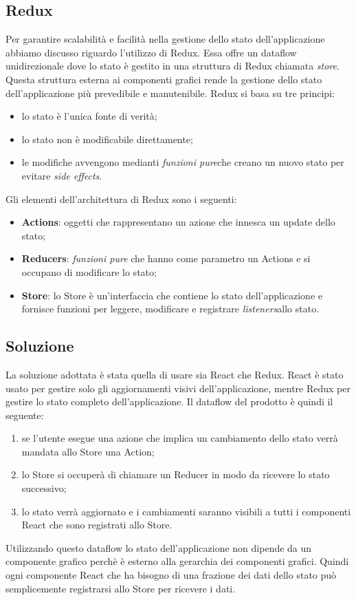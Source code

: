 \subsection{Redux}
Per garantire scalabilità e facilità nella gestione dello stato dell'applicazione abbiamo discusso riguardo l'utilizzo di Redux. Essa offre un dataflow unidirezionale dove lo stato è gestito in una struttura di Redux chiamata \emph{store}. Questa struttura esterna ai componenti grafici rende la gestione dello stato dell'applicazione più prevedibile e manutenibile. Redux si basa su tre principi:
\begin{itemize}
	\item lo stato è l'unica fonte di verità;
	\item lo stato non è modificabile direttamente;
	\item le modifiche avvengono medianti \emph{funzioni pure}\glosp che creano un nuovo stato per evitare \emph{side effects}\glo.
\end{itemize}
\noindent
Gli elementi dell'architettura di Redux sono i seguenti:
\begin{itemize}
	\item \textbf{Actions}: oggetti che rappresentano un azione che innesca un update dello stato;
	\item \textbf{Reducers}: \emph{funzioni pure} che hanno come parametro un Actions e si occupano di modificare lo stato;
	\item \textbf{Store}: lo Store è un'interfaccia che contiene lo stato dell'applicazione e fornisce funzioni per leggere, modificare e registrare \emph{listeners}\glosp allo stato.
\end{itemize}
\noindent

\subsection{Soluzione}
La soluzione adottata è stata quella di usare sia React che Redux. React è stato usato per gestire solo gli aggiornamenti visivi dell'applicazione, mentre Redux per gestire lo stato completo dell'applicazione. Il dataflow del prodotto è quindi il seguente:
\begin{enumerate}
	\item se l'utente esegue una azione che implica un cambiamento dello stato verrà mandata allo Store una Action;
	\item lo Store si occuperà di chiamare un Reducer in modo da ricevere lo stato successivo;
	\item lo stato verrà aggiornato e i cambiamenti saranno visibili a tutti i componenti React che sono registrati allo Store.
\end{enumerate}
Utilizzando questo dataflow lo stato dell'applicazione non dipende da un componente grafico perchè è esterno alla gerarchia dei componenti grafici. Quindi ogni componente React che ha bisogno di una frazione dei dati dello stato può semplicemente registrarsi allo Store per ricevere i dati.

